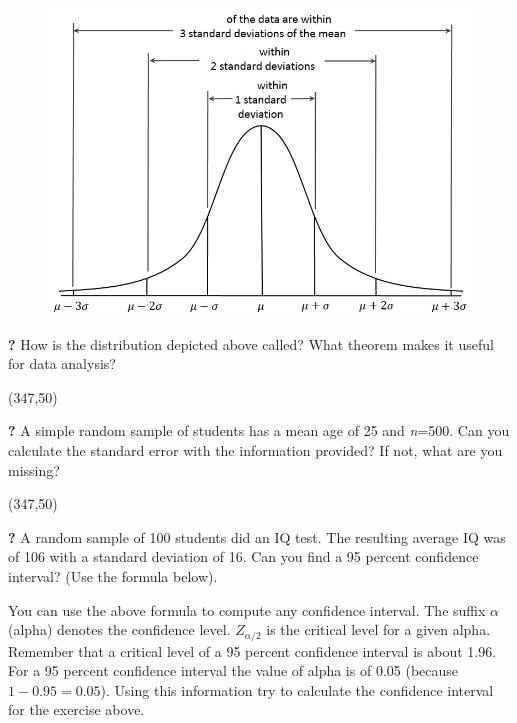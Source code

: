 \begin{figure}[H]
	\includegraphics[width=\linewidth]{./img/gaussian_distribution.jpg}
\end{figure}

\forceindent \textbf{?} How is the distribution depicted above called? What theorem makes it useful for data analysis?

\framebox(347,50){}

\forceindent \textbf{?} A simple random sample of students has a mean age of 25 and \textit{n}=500. Can you calculate the standard error with the information provided? If not, what are you missing?

\framebox(347,50){}

\forceindent \textbf{?} A random sample of 100 students did an IQ test. The resulting average IQ was of 106 with a standard deviation of 16. Can you find a 95 percent confidence interval? (Use the formula below).

\begin{center}
\end{center}

You can use the above formula to compute any confidence interval. The suffix $\alpha$ (alpha) denotes the confidence level. $Z_{\alpha/2}$ is the critical level for a given alpha. Remember that a critical level of a 95 percent confidence interval is about 1.96. For a 95 percent confidence interval the value of alpha is of 0.05 (because $1-0.95=0.05$). Using this information try to calculate the confidence interval for the exercise above.

